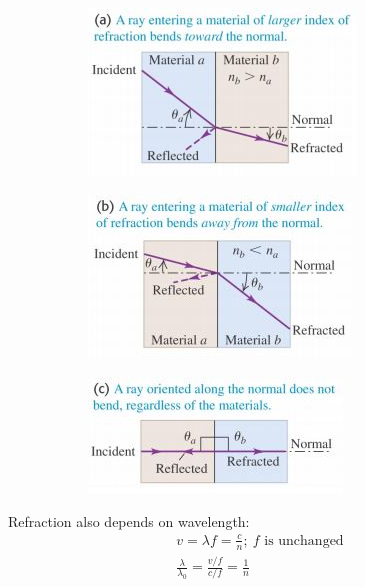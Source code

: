\documentclass[a4paper, 11pt, fleqn, normalem]{report}
\begin{document}
\begin{figure}[H]
    \begin{subfigure}{0.3\textwidth}
        \includegraphics[width=\textwidth]{Refrac1.jpg}
    \end{subfigure}
    \begin{subfigure}{0.3\textwidth}
        \includegraphics[width=\textwidth]{Refrac2.jpg}
    \end{subfigure}
    \begin{subfigure}{0.3\textwidth}
        \includegraphics[width=\textwidth]{Refrac3.jpg}
    \end{subfigure}
\end{figure}
Refraction also depends on wavelength:
\begin{gather*}
    v = \lambda f = \frac{c}{n};~f\text{ is unchanged} \\
    \frac{\lambda}{\lambda_{0}} = \frac{v/f}{c/f} = \frac{1}{n}
\end{gather*}
\end{document}
